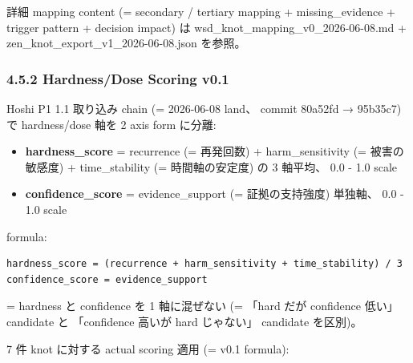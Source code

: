 \documentclass[
]{article}
\providecommand{\tightlist}{%
  \setlength{\itemsep}{0pt}\setlength{\parskip}{0pt}}
\begin{document}
詳細 mapping content (= secondary / tertiary mapping + missing\_evidence
+ trigger pattern + decision impact) は
wsd\_knot\_mapping\_v0\_2026-06-08.md +
zen\_knot\_export\_v1\_2026-06-08.json を参照。

\subsubsection{4.5.2 Hardness/Dose Scoring
v0.1}\label{hardnessdose-scoring-v0.1}

Hoshi P1 1.1 取り込み chain (= 2026-06-08 land、 commit 80a52fd →
95b35c7) で hardness/dose 軸を 2 axis form に分離:

\begin{itemize}
\tightlist
\item
  \textbf{hardness\_score} = recurrence (= 再発回数) + harm\_sensitivity
  (= 被害の敏感度) + time\_stability (= 時間軸の安定度) の 3 軸平均、
  0.0 - 1.0 scale
\item
  \textbf{confidence\_score} = evidence\_support (= 証拠の支持強度)
  単独軸、 0.0 - 1.0 scale
\end{itemize}

formula:

\begin{verbatim}
hardness_score = (recurrence + harm_sensitivity + time_stability) / 3
confidence_score = evidence_support
\end{verbatim}

= hardness と confidence を 1 軸に混ぜない (= 「hard だが confidence
低い」 candidate と 「confidence 高いが hard じゃない」 candidate
を区別)。

7 件 knot に対する actual scoring 適用 (= v0.1 formula):
\end{document}

